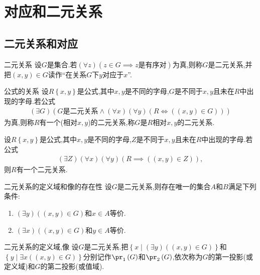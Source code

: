 \chapter{对应和二元关系}

\section{二元关系和对应}

\begin{definition}{二元关系}{}
	设$G$是集合.若$\left(\forall z\right)\left(z\in G\implies z\text{是有序对}\right)$为真,则称$G$是二元关系,并把$\left(x,y\right)\in G$读作``在关系$G$下$y$对应于$x$''.
\end{definition}

\begin{definition}{公式的关系}{}
	设$R\left\{x,y\right\}$是公式,其中$x,y$是不同的字母,$G$是不同于$x,y$且未在$R$中出现的字母.若公式
	\begin{align*}
		\left(\exists G\right)\left(G\text{是二元关系}\wedge\left(\forall x\right)\left(\forall y\right)\left(R\iff\left(\left(x,y\right)\in G\right)\right)\right)
	\end{align*}
	为真,则称$R$有一个(相对$x,y$)的二元关系,称$G$是$R$相对$x,y$的二元关系.
\end{definition}

\begin{proposition}{}{}
	设$R\left\{x,y\right\}$是公式,其中$x,y$是不同的字母,$Z$是不同于$x,y$且未在$R$中出现的字母.若公式
	\begin{align*}
		\left(\exists Z\right)\left(\forall x\right)\left(\forall y\right)\left(R\implies\left(\left(x,y\right)\in Z\right)\right),
	\end{align*}
	则$R$有一个二元关系.
\end{proposition}

\begin{proposition}{二元关系的定义域和像的存在性}{}
	设$G$是二元关系,则存在唯一的集合$A$和$B$满足下列条件:
	\begin{enumerate}
		\item $\left(\exists y\right)\left(\left(x,y\right)\in G\right)$和$x\in A$等价.
		\item $\left(\exists x\right)\left(\left(x,y\right)\in G\right)$和$y\in A$等价.
	\end{enumerate}
\end{proposition}

\begin{definition}{二元关系的定义域,像}{}
	设$G$是二元关系.把$\left\{x\middle|\left(\exists y\right)\left(\left(x,y\right)\in G\right)\right\}$和$\left\{y\middle|\exists x\left(\left(x,y\right)\in G\right)\right\}$分别记作$\pr_{1}\left(G\right)$和$\pr_{2}\left(G\right)$,依次称为$G$的第一投影(或定义域)和$G$的第二投影(或值域).
\end{definition}

